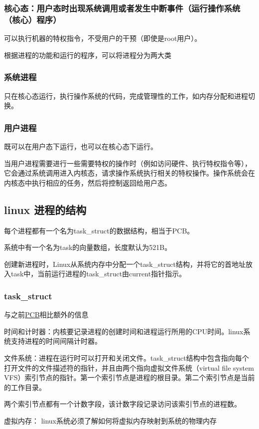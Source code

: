 \documentclass{ctexart}
\begin{document}
\subsubsection{核心态：用户态时出现系统调用或者发生中断事件（运行操作系统（核心）程序）}
可以执行机器的特权指令，不受用户的干预（即使是root用户）。

\vspace{\baselineskip}

根据进程的功能和运行的程序，可以将进程分为两大类
\subsubsection{系统进程}
只在核心态运行，执行操作系统的代码，完成管理性的工作，如内存分配和进程切换。
\subsubsection{用户进程}
既可以在用户态下运行，也可以在核心态下运行。

当用户进程需要进行一些需要特权的操作时（例如访问硬件、执行特权指令等），它会通过系统调用进入内核态，请求操作系统执行相关的特权操作。操作系统会在内核态中执行相应的任务，然后将控制返回给用户态。
\subsection{linux 进程的结构}
每个进程都有一个名为task\_struct的数据结构，相当于PCB。

系统中有一个名为task的向量数组，长度默认为521B。

创建新进程时，Linux从系统内存中分配一个task\_struct结构，并将它的首地址放入task中，当前运行进程的task\_struct由current指针指示。

\subsubsection{task\_struct}
与之前\hyperref[pcb]{PCB}相比额外的信息

时间和计时器：内核要记录进程的创建时间和进程运行所用的CPU时间。linux系统支持进程的时间间隔计时器。

文件系统：进程在运行时可以打开和关闭文件。task\_struct结构中包含指向每个打开文件的文件描述符的指针，并且由两个指向虚拟文件系统（virtual file system VFS）索引节点的指针。第一个索引节点是进程的根目录。第二个索引节点是当前的工作目录。

两个索引节点都有一个计数字段，该计数字段记录访问该索引节点的进程数。

虚拟内存： linux系统必须了解如何将虚拟内存映射到系统的物理内存
\end{document}
